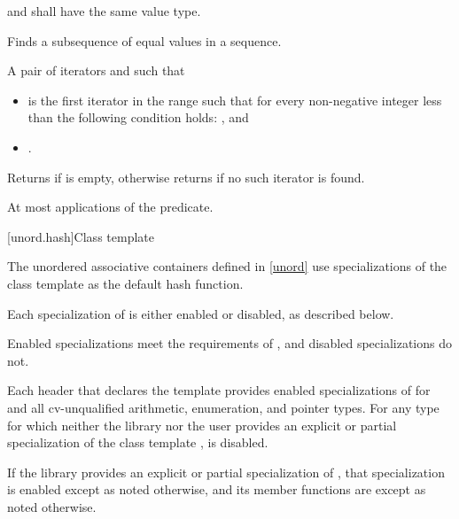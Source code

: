 \begin{itemdescr}
\pnum
\requires
{} and  shall have the same value type.

\pnum
\effects
Finds a subsequence of equal values in a sequence.

\pnum
\returns
A pair of iterators  and  such that
\begin{itemize}
\item {} is the first iterator  in the range
 such that
for every non-negative integer  less than 
the following condition holds:
, and
\item {}.
\end{itemize}
Returns  if  is empty,
otherwise returns  if no such iterator is found.

\pnum
\complexity
At most  applications of the predicate.
\end{itemdescr}

[unord.hash]{Class template }

\pnum
{}%
%
The unordered associative containers defined in \ref{unord} use
specializations of the class template 
as the default hash function.

\pnum
Each specialization of  is either enabled or disabled,
as described below.
\begin{note}
Enabled specializations meet the requirements of , and
disabled specializations do not.
\end{note}
Each header that declares the template 
provides enabled specializations of  for  and
all cv-unqualified arithmetic, enumeration, and pointer types.
For any type  for which neither the library nor the user provides
an explicit or partial specialization of the class template ,
 is disabled.

\pnum
If the library provides an explicit or partial specialization of ,
that specialization is enabled except as noted otherwise,
and its member functions are  except as noted otherwise.

